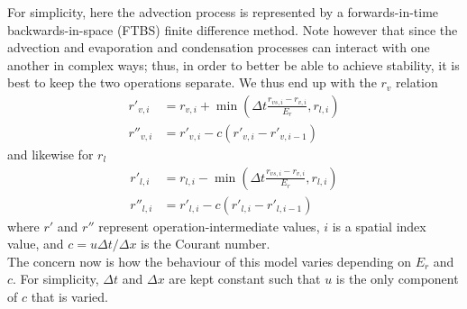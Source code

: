 \documentclass[11pt]{article}
\begin{document}
For simplicity, here the advection process is represented by a forwards-in-time backwards-in-space (FTBS) finite difference method. Note however that since the advection and evaporation and condensation processes can interact with one another in complex ways; thus, in order to better be able to achieve stability, it is best to keep the two operations separate. We thus end up with the $r_v$ relation
\begin{align} \label{eq:4}
r'_{v,i} &= r_{v,i} + \min\left(\Delta t\frac{r_{vs,i} - r_{v,i}}{E_r},r_{l,i}\right) \\ \label{eq:5}
r''_{v,i} &= r'_{v,i} - c\left(r'_{v,i} - r'_{v,i-1}\right)
\end{align}
and likewise for $r_l$
\begin{align} \label{eq:6}
r'_{l,i} &= r_{l,i} - \min\left(\Delta t\frac{r_{vs,i} - r_{v,i}}{E_r},r_{l,i}\right) \\ \label{eq:7}
r''_{l,i} &= r'_{l,i} - c\left(r'_{l,i} - r'_{l,i-1}\right)
\end{align}
where $r'$ and $r''$ represent operation-intermediate values, $i$ is a spatial index value, and $c=u \Delta t/\Delta x$ is the Courant number. \\
The concern now is how the behaviour of this model varies depending on $E_r$ and $c$. For simplicity, $\Delta t$ and $\Delta x$ are kept constant such that $u$ is the only component of $c$ that is varied.
\end{document}
